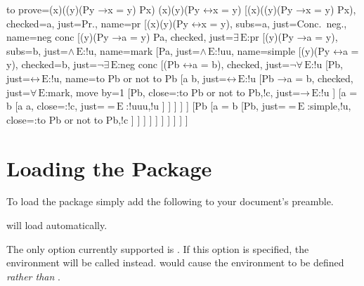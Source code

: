 \documentclass[10pt,british,a4paper,doc2]{ltxdoc}
\newcommand*\pkg[1]{\textsf{#1}}
\newlength\tewadjust
\newcommand*{\lif}{\ensuremath{\mathbin{\rightarrow}}}
\newcommand*{\liff}{\ensuremath{\mathbin{\leftrightarrow}}}
\newcommand*{\elim}{\,\text{E}}
\begin{document}
\begin{tableau}
  {
    to prove={(\exists x)((\forall y)(Py \lif x = y) \land Px) \sststile{}{} (\exists x)(\forall y)(Py \liff x = y)}
  }
  [{(\exists x)((\forall y)(Py \lif x = y) \land Px)}, checked=a, just=Pr., name=pr
    [{\lnot (\exists x)(\forall y)(Py \liff x = y)}, subs=a, just=Conc.~neg., name=neg conc
      [{(\forall y)(Py \lif a = y) \land Pa}, checked, just=$\exists\elim$:pr
        [{(\forall y)(Py \lif a = y)}, subs=b, just=$\land\elim$:!u, name=mark
          [Pa, just=$\land\elim$:!uu, name=simple
            [{\lnot (\forall y)(Py \liff a = y)}, checked=b, just=$\lnot\exists\elim$:neg conc
              [{\lnot (Pb \liff a = b)}, checked, just=$\lnot\forall\elim$:!u
                [Pb, just=$\liff\elim$:!u, name=to Pb or not to Pb
                  [a \neq b, just=$\liff\elim$:!u
                  [{Pb \lif a = b}, checked, just=$\forall\elim$:mark, move by=1
                      [\lnot Pb, close={:to Pb or not to Pb,!c}, just=$\lif\elim$:!u
                      ]
                      [{a = b}
                        [a \neq a, close={:!c}, just={$=\elim$:{!uuu,!u}}
                        ]
                      ]
                  ]
                ]
                ]
                [\lnot Pb
                  [{a = b}
                    [Pb, just={$=\elim$:{simple,!u}}, close={:to Pb or not to Pb,!c}
                    ]
                  ]
                ]
              ]
            ]
          ]
        ]
      ]
    ]
  ]
\end{tableau}


\restoregeometry
\setlength\tewadjust{\marginparwidth+\marginparsep-\paperwidth+\textwidth+\oddsidemargin+1in}%
\fancyheadoffset[lh]{\tewadjust}%
\section{Loading the Package}\label{sec:llwytho}

To load the package simply add the following to your document's preamble.
\begin{latexcode}
\usepackage{prooftrees}
\end{latexcode}
\keyname[pkg]{\pkg{prooftrees}} will load \keyname[pkg]{\pkg{forest}} automatically.

The only option currently supported is .
If this option is specified, the  environment will be called  instead.
 would cause the  environment to be defined \emph{rather than} .
\end{document}
